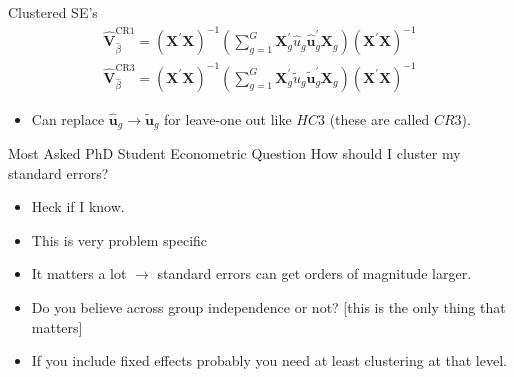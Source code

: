 \begin{frame}{Clustered SE's}
\begin{align*}
\widehat { \boldsymbol { V } } _ { \hat { \beta } } ^ { \mathrm { CR } 1 } = \left( \boldsymbol { X } ^ { \prime } \boldsymbol { X } \right) ^ { - 1 } \left( \sum _ { g = 1 } ^ { G } \boldsymbol { X } _ { g } ^ { \prime } \widehat { u } _ { g } \widehat { \boldsymbol { u } } _ { g } ^ { \prime } \boldsymbol { X } _ { g } \right) \left( \boldsymbol { X } ^ { \prime } \boldsymbol { X } \right) ^ { - 1 }\\
\widehat { \boldsymbol { V } } _ { \hat { \beta } } ^ { \mathrm { CR } 3 } = \left( \boldsymbol { X } ^ { \prime } \boldsymbol { X } \right) ^ { - 1 } \left( \sum _ { g = 1 } ^ { G } \boldsymbol { X } _ { g } ^ { \prime } \widetilde { u } _ { g } \widetilde { \boldsymbol { u } } _ { g } ^ { \prime } \boldsymbol { X } _ { g } \right) \left( \boldsymbol { X } ^ { \prime } \boldsymbol { X } \right) ^ { - 1 }
\end{align*}
\begin{itemize}
\item Can replace  $\hat { \mathbf{u}}_g  \rightarrow \tilde { \mathbf{u}}_g $ for leave-one out like $HC3$ (these are called $CR3$).
\end{itemize}
\end{frame}




\begin{frame}{Most Asked PhD Student Econometric Question}
 How should I cluster my standard errors?
\begin{itemize}
\item Heck if I know.
\item This is very problem specific
\item It matters a lot $\rightarrow$ standard errors can get orders of magnitude larger.
\item Do you believe across group independence or not? [this is the only thing that matters]
\item If you include \alert{fixed effects} probably you need at least clustering at that level.
\end{itemize}
\end{frame}


